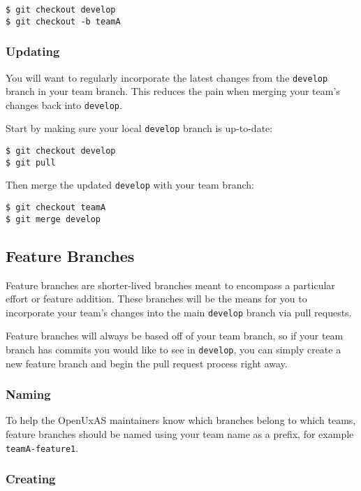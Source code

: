 \begin{verbatim}
$ git checkout develop
$ git checkout -b teamA
\end{verbatim}

\subsubsection{Updating}\label{updating}

You will want to regularly incorporate the latest changes from the
\texttt{develop} branch in your team branch. This reduces the pain when
merging your team's changes back into \texttt{develop}.

Start by making sure your local \texttt{develop} branch is up-to-date:

\begin{verbatim}
$ git checkout develop
$ git pull
\end{verbatim}

Then merge the updated \texttt{develop} with your team branch:

\begin{verbatim}
$ git checkout teamA
$ git merge develop
\end{verbatim}

\subsection{Feature Branches}\label{feature-branches}

Feature branches are shorter-lived branches meant to encompass a
particular effort or feature addition. These branches will be the means
for you to incorporate your team's changes into the main
\texttt{develop} branch via pull requests.

Feature branches will always be based off of your team branch, so if
your team branch has commits you would like to see in \texttt{develop},
you can simply create a new feature branch and begin the pull request
process right away.

\subsubsection{Naming}\label{naming}

To help the OpenUxAS maintainers know which branches belong to which
teams, feature branches should be named using your team name as a
prefix, for example \texttt{teamA-feature1}.

\subsubsection{Creating}\label{creating-1}

